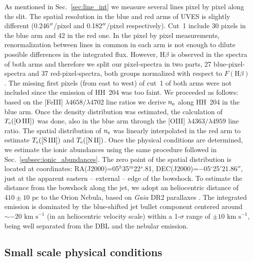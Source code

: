 \documentclass[twocolumn]{aastex63}
\begin{document}
As mentioned in Sec.~\ref{sec:line_int} we measure several lines pixel by pixel along the slit. The spatial re\-so\-lu\-tion in the blue and red arms of UVES is slightly different (0.246$\mbox{$^{\prime\prime}$}$/pixel and 0.182$\mbox{$^{\prime\prime}$}$/pixel respectively). Cut~1 include 30 pixels in the blue arm and 42 in the red one. In the pixel by pixel measurements, renormalization between lines in common in each arm is not enough to dilute possible differences in the integrated flux. However, $\text{H}\beta$ is observed in the spectra of both arms and therefore we split our pixel-spectra in two parts, 27 blue-pixel-spectra and 37 red-pixel-spectra, both groups normalized with respect to $F(\text{H}\beta)$. The missing first pixels (from east to west) of cut~1 of both arms were not included since the emission of HH~204 was too faint. We proceeded as follows: based on the [Fe\thinspace III] $\lambda4658/\lambda 4702$ line ratios we derive $n_{\rm e}$ along HH~204 in the blue arm. Once the density distribution was estimated,  the calculation of $T_{\rm e}(\text{[O\thinspace III]})$ was done, also in the blue arm through the [O\thinspace III] $\lambda4363/\lambda 4959$ line ratio. The spatial distribution of $n_{\rm e}$ was linearly interpolated in the red arm to estimate $T_{\rm e}(\text{[S\thinspace III]})$ and $T_{\rm e}(\text{[N\thinspace II]})$. Once the physical conditions are determined, we estimate the ionic abundances using the same procedure followed in Sec.~\ref{subsec:ionic_abundances}. The zero point of the spatial distribution is located at coordinates: RA(J2000)=05$^h$35$^m$22$^s$.81, DEC(J2000)=$-$05$^{\circ}$25$'$21.86$''$, just at the apparent eastern -- external -- edge of the bowshock. To estimate the distance from the bowshock along the jet, we adopt an heliocentric distance of $410 \pm 10 \text{ pc}$ \citep{Binder2018} to the Orion Nebula, based on \textit{Gaia} DR2 parallaxes \citep{gaiadr2}. The integrated emission is dominated by the blue-shifted jet bullet component centered around $\sim -20 \text{ km s}^{-1}$ (in an heliocentric velocity scale) within a 1-$\sigma$ range of $\pm 10 \text{ km s}^{-1}$, being well separated from the DBL and the nebular emission.



\subsection{Small scale physical conditions}
\label{subsec:small_scale_pc}
\end{document}
